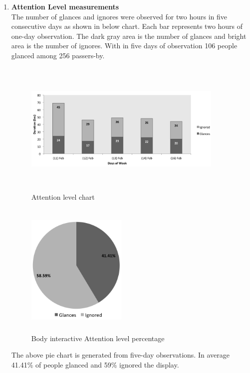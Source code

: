 \begin{enumerate}
\item \textbf{Attention Level measurements} \\
The number of glances and ignores were observed for two hours in five consecutive days as shown in below chart. Each bar represents two hours of one-day observation. The dark gray area is the number of glances and bright area is the number of ignores. With in five days of observation 106 people glanced among 256 passers-by.
\begin{figure}[H]
    \centering
    \includegraphics[width=0.9\textwidth,height=6.5cm]{Figures/8/body_inter_findings/Body_Inter_chart}%
    \caption{Attention level chart}%
    \label{fig:bodyattentionlevelchart}%
\end{figure}


\begin{figure}[H]
    \centering
    \includegraphics[width=0.45\textwidth,height=6.5cm]{Figures/8/body_inter_findings/body_inter_percentage}
    \caption{Body interactive Attention level percentage}%
    \label{fig:bodyattentionlevelpercentage}%
\end{figure}

The above pie chart is generated from five-day observations. In average 41.41\% of people glanced and 59\% ignored the display. 


\end{enumerate}
